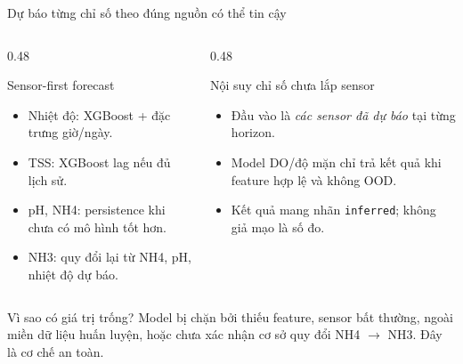 \begin{frame}{Dự báo từng chỉ số theo đúng nguồn có thể tin cậy}
  \begin{columns}[T]
    \begin{column}{0.48\textwidth}
      \begin{block}{Sensor-first forecast}
        \begin{itemize}
          \item Nhiệt độ: XGBoost + đặc trưng giờ/ngày.
          \item TSS: XGBoost lag nếu đủ lịch sử.
          \item pH, NH4: persistence khi chưa có mô hình tốt hơn.
          \item NH3: quy đổi lại từ NH4, pH, nhiệt độ dự báo.
        \end{itemize}
      \end{block}
    \end{column}
    \begin{column}{0.48\textwidth}
      \begin{exampleblock}{Nội suy chỉ số chưa lắp sensor}
        \begin{itemize}
          \item Đầu vào là \textit{các sensor đã dự báo} tại từng horizon.
          \item Model DO/độ mặn chỉ trả kết quả khi feature hợp lệ và không OOD.
          \item Kết quả mang nhãn \texttt{inferred}; không giả mạo là số đo.
        \end{itemize}
      \end{exampleblock}
    \end{column}
  \end{columns}
  \vspace{0.5em}
  \begin{alertblock}{Vì sao có giá trị trống?}
    Model bị chặn bởi thiếu feature, sensor bất thường, ngoài miền dữ liệu huấn luyện,
    hoặc chưa xác nhận cơ sở quy đổi NH4 $\to$ NH3. Đây là cơ chế an toàn.
  \end{alertblock}
\end{frame}

